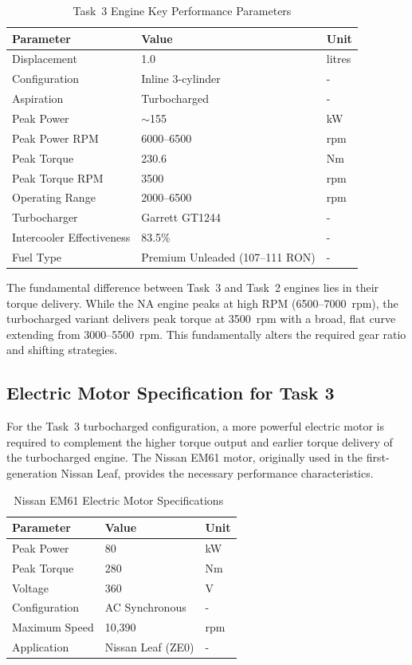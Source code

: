 \begin{table}[H]
\centering
\caption{Task~3 Engine Key Performance Parameters}
\label{tab:task3_engine_summary}
\small
\begin{tabular}{@{}lll@{}}
\toprule
\textbf{Parameter} & \textbf{Value} & \textbf{Unit} \\
\midrule
Displacement & 1.0 & litres \\
Configuration & Inline 3-cylinder & - \\
Aspiration & Turbocharged & - \\
Peak Power & $\sim$155 & kW \\
Peak Power RPM & 6000--6500 & rpm \\
Peak Torque & 230.6 & Nm \\
Peak Torque RPM & 3500 & rpm \\
Operating Range & 2000--6500 & rpm \\
Turbocharger & Garrett GT1244 & - \\
Intercooler Effectiveness & 83.5\% & - \\
Fuel Type & Premium Unleaded (107--111 RON) & - \\
\bottomrule
\end{tabular}
\end{table}

The fundamental difference between Task~3 and Task~2 engines lies in their torque delivery. While the NA engine peaks at high RPM (6500--7000~rpm), the turbocharged variant delivers peak torque at 3500~rpm with a broad, flat curve extending from 3000--5500~rpm. This fundamentally alters the required gear ratio and shifting strategies.

\subsection{Electric Motor Specification for Task 3}

For the Task~3 turbocharged configuration, a more powerful electric motor is required to complement the higher torque output and earlier torque delivery of the turbocharged engine. The Nissan EM61 motor, originally used in the first-generation Nissan Leaf, provides the necessary performance characteristics.

\begin{table}[H]
\centering
\caption{Nissan EM61 Electric Motor Specifications~\cite{nissan_leaf_motor, nissan_em61_specs}}
\label{tab:em61_specs}
\small
\begin{tabular}{@{}lll@{}}
\toprule
\textbf{Parameter} & \textbf{Value} & \textbf{Unit} \\
\midrule
Peak Power & 80 & kW \\
Peak Torque & 280 & Nm \\
Voltage & 360 & V \\
Configuration & AC Synchronous & - \\
Maximum Speed & 10,390 & rpm \\
Application & Nissan Leaf (ZE0) & - \\
\bottomrule
\end{tabular}
\end{table}

